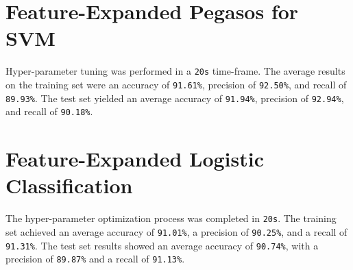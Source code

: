 \section{Feature-Expanded Pegasos for SVM}

Hyper-parameter tuning was performed in a \texttt{20s} time-frame. The average results on the training set were an accuracy of \texttt{91.61\%}, precision of \texttt{92.50\%}, and recall of \texttt{89.93\%}. The test set yielded an average accuracy of \texttt{91.94\%}, precision of \texttt{92.94\%}, and recall of \texttt{90.18\%}.

\section{Feature-Expanded Logistic Classification}

The hyper-parameter optimization process was completed in \texttt{20s}. The training set achieved an average accuracy of \texttt{91.01\%}, a precision of \texttt{90.25\%}, and a recall of \texttt{91.31\%}. The test set results showed an average accuracy of \texttt{90.74\%}, with a precision of \texttt{89.87\%} and a recall of \texttt{91.13\%}.